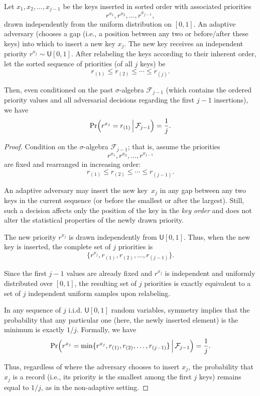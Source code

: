 \begin{lemma}\label{lemma:tre}
Let $x_1, x_2, \ldots, x_{j-1}$ be the keys inserted in sorted order with associated priorities 
$$r^{x_1}, r^{x_2}, \ldots, r^{x_{j-1}},$$
drawn independently from the uniform distribution on $[0,1]$. An adaptive adversary (chooses a gap (i.e., a position between any two or before/after these keys) into which to insert a new key $x_j$. The new key receives an independent priority $r^{x_j} \sim \mathsf{U}[0,1]$. After relabeling the keys according to their inherent order, let the sorted sequence of priorities (of all $j$ keys) be
$$r_{(1)} \le r_{(2)} \le \cdots \le r_{(j)}.$$

Then, even conditioned on the past $\sigma$-algebra $\mathcal{F}_{j-1}$ (which contains the ordered priority values and all adversarial decisions regarding the first $j-1$ insertions), we have
$$\Pr\Bigl(r^{x_j} = r_{(1)} \,\Big|\, \mathcal{F}_{j-1}\Bigr) = \frac{1}{j}.$$

\end{lemma}

\begin{proof}
Condition on the $\sigma$-algebra $\mathcal{F}_{j-1}$; that is, assume the priorities
$$r^{x_1}, r^{x_2}, \ldots, r^{x_{j-1}}$$
are fixed and rearranged in increasing order:
$$r_{(1)} \le r_{(2)} \le \cdots \le r_{(j-1)}.$$

An adaptive adversary may insert the new key~$x_j$ in any gap between any two keys in the current sequence (or before the smallest or after the largest). Still, such a decision affects only the position of the key in the \emph{key order} and does not alter the statistical properties of the newly drawn priority.

The new priority $r^{x_j}$ is drawn independently from $\mathsf{U}[0,1]$. Thus, when the new key is inserted, the complete set of $j$ priorities is
$$\{r^{x_j}, r_{(1)}, r_{(2)}, \ldots, r_{(j-1)}\}.$$

Since the first $j-1$ values are already fixed and $r^{x_j}$ is independent and uniformly distributed over $[0,1]$, the resulting set of $j$ priorities is exactly equivalent to a set of $j$ independent uniform samples upon relabeling.

In any sequence of $j$ i.i.d. $\mathsf{U}[0,1]$ random variables, symmetry implies that the probability that any particular one (here, the newly inserted element) is the minimum is exactly $1/j$. Formally, we have
$$\Pr\Bigl(r^{x_j} = \min\{r^{x_j},r_{(1)}, r_{(2)}, \ldots, r_{(j-1)}\}\,\Big|\, \mathcal{F}_{j-1} \Bigr) = \frac{1}{j}.$$

Thus, regardless of where the adversary chooses to insert $x_j$, the probability that $x_j$ is a record (i.e., its priority is the smallest among the first $j$ keys) remains equal to $1/j$, as in the non-adaptive setting.
\end{proof}

